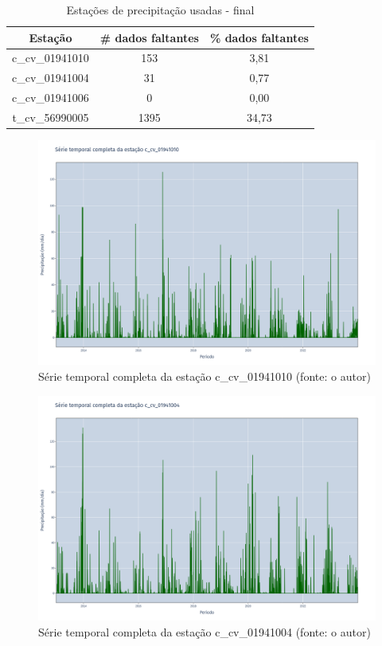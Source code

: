 \begin{table}[h!]
\centering \small
\caption{Estações de precipitação usadas - final}
\begin{tabular}{|c|c|c|} \hline
\textbf{Estação} & \textbf{\# dados faltantes} & \textbf{\% dados faltantes} \\ \hline
c\_cv\_01941010  & 153                         & 3,81 \\ \hline
c\_cv\_01941004  & 31                          & 0,77 \\ \hline
c\_cv\_01941006  & 0                           & 0,00 \\ \hline
t\_cv\_56990005  & 1395                        & 34,73 \\ \hline
\end{tabular}
\label{tab:estacoes_chuva_usadas_final_rio_doce}
\end{table}

\begin{figure}[!h]
\centering
\includegraphics[scale=0.25]{Figuras/rio_doce/doceSerieCompleta_c_cv_01941010.png}
\caption{Série temporal completa da estação c\_cv\_01941010 (fonte: o autor)}
\label{fig:doceSerieCompleta_c_cv_01941010}
\end{figure}

\begin{figure}[!h]
\centering
\includegraphics[scale=0.25]{Figuras/rio_doce/doceSerieCompleta_c_cv_01941004.png}
\caption{Série temporal completa da estação c\_cv\_01941004 (fonte: o autor)}
\label{fig:doceSerieCompleta_c_cv_01941004}
\end{figure}

